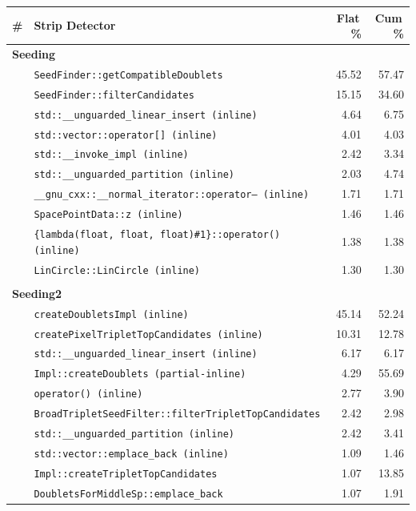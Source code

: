 \begin{tabular}{rlrr}
\toprule
\textbf{\#} & \textbf{Strip Detector} & \textbf{Flat\,\%} & \textbf{Cum\,\%} \\
\midrule
\multicolumn{4}{l}{\textbf{Seeding}} \\
\quad & \texttt{SeedFinder::getCompatibleDoublets} & 45.52 & 57.47 \\
\quad & \texttt{SeedFinder::filterCandidates} & 15.15 & 34.60 \\
\quad & \texttt{std::\_\_unguarded\_linear\_insert (inline)} & 4.64 & 6.75 \\
\quad & \texttt{std::vector::operator[] (inline)} & 4.01 & 4.03 \\
\quad & \texttt{std::\_\_invoke\_impl (inline)} & 2.42 & 3.34 \\
\quad & \texttt{std::\_\_unguarded\_partition (inline)} & 2.03 & 4.74 \\
\quad & \texttt{\_\_gnu\_cxx::\_\_normal\_iterator::operator-- (inline)} & 1.71 & 1.71 \\
\quad & \texttt{SpacePointData::z (inline)} & 1.46 & 1.46 \\
\quad & \texttt{\{lambda(float, float, float)\#1\}::operator() (inline)} & 1.38 & 1.38 \\
\quad & \texttt{LinCircle::LinCircle (inline)} & 1.30 & 1.30 \\
\\[-0.5em]
\multicolumn{4}{l}{\textbf{Seeding2}} \\
\quad & \texttt{createDoubletsImpl (inline)} & 45.14 & 52.24 \\
\quad & \texttt{createPixelTripletTopCandidates (inline)} & 10.31 & 12.78 \\
\quad & \texttt{std::\_\_unguarded\_linear\_insert (inline)} & 6.17 & 6.17 \\
\quad & \texttt{Impl::createDoublets (partial-inline)} & 4.29 & 55.69 \\
\quad & \texttt{operator() (inline)} & 2.77 & 3.90 \\
\quad & \texttt{BroadTripletSeedFilter::filterTripletTopCandidates} & 2.42 & 2.98 \\
\quad & \texttt{std::\_\_unguarded\_partition (inline)} & 2.42 & 3.41 \\
\quad & \texttt{std::vector::emplace\_back (inline)} & 1.09 & 1.46 \\
\quad & \texttt{Impl::createTripletTopCandidates} & 1.07 & 13.85 \\
\quad & \texttt{DoubletsForMiddleSp::emplace\_back} & 1.07 & 1.91 \\
\bottomrule
\end{tabular}
